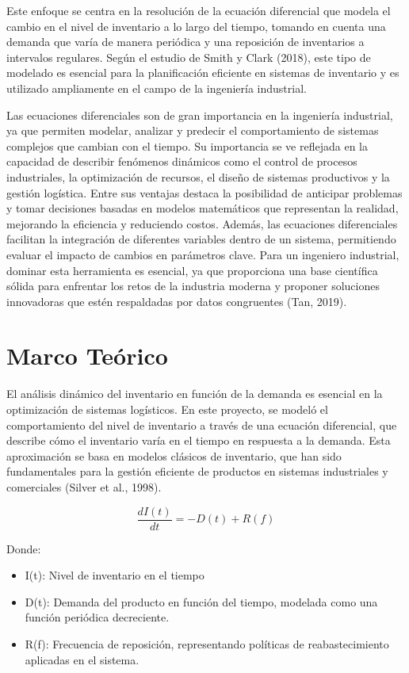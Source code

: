 \documentclass[12pt]{article}
\begin{document}
Este enfoque se centra en la resolución de la ecuación diferencial que modela el cambio en el nivel de inventario a lo largo del tiempo, tomando en cuenta una demanda que varía de manera periódica y una reposición de inventarios a intervalos regulares. Según el estudio de Smith y Clark (2018), este tipo de modelado es esencial para la planificación eficiente en sistemas de inventario y es utilizado ampliamente en el campo de la ingeniería industrial.

Las ecuaciones diferenciales son de gran importancia en la ingeniería industrial, ya que permiten modelar, analizar y predecir el comportamiento de sistemas complejos que cambian con el tiempo. Su importancia se ve reflejada en la capacidad de describir fenómenos dinámicos como el control de procesos industriales, la optimización de recursos, el diseño de sistemas productivos y la gestión logística. Entre sus ventajas destaca la posibilidad de anticipar problemas y tomar decisiones basadas en modelos matemáticos que representan la realidad, mejorando la eficiencia y reduciendo costos. Además, las ecuaciones diferenciales facilitan la integración de diferentes variables dentro de un sistema, permitiendo evaluar el impacto de cambios en parámetros clave. Para un ingeniero industrial, dominar esta herramienta es esencial, ya que proporciona una base científica sólida para enfrentar los retos de la industria moderna y proponer soluciones innovadoras que estén respaldadas por datos congruentes (Tan, 2019).

\section*{Marco Teórico}
El análisis dinámico del inventario en función de la demanda es esencial en la optimización de sistemas logísticos. En este proyecto, se modeló el comportamiento del nivel de inventario a través de una ecuación diferencial, que describe cómo el inventario varía en el tiempo en respuesta a la demanda. Esta aproximación se basa en modelos clásicos de inventario, que han sido fundamentales para la gestión eficiente de productos en sistemas industriales y comerciales (Silver et al., 1998).

\begin{equation}
\frac{dI(t)}{dt} = - D(t) + R(f)
\end{equation}

Donde:

\begin{itemize}
    \item I(t): Nivel de inventario en el tiempo
    \item D(t): Demanda del producto en función del tiempo, modelada como una función periódica decreciente.
    \item R(f): Frecuencia de reposición, representando políticas de reabastecimiento aplicadas en el sistema.
\end{itemize}
\end{document}
